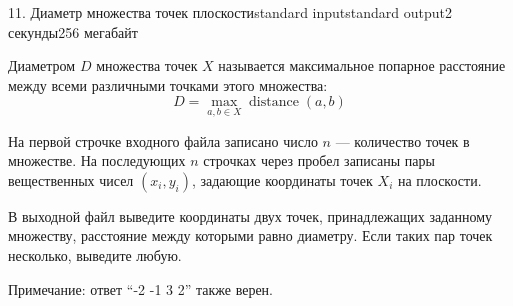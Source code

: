 \begin{problem}{11. Диаметр множества точек плоскости}{standard input}{standard output}{2 секунды}{256 мегабайт}

Диаметром $D$ множества точек $X$ называется максимальное попарное расстояние между всеми различными точками этого множества:
$$ D = \max\limits_{a, b \in X} \operatorname{distance}(a, b) $$

\InputFile

На первой строчке входного файла записано число $n$ — количество точек в множестве. На последующих $n$ строчках через пробел записаны пары вещественных чисел $(x_i, y_i)$, задающие координаты точек $X_i$ на плоскости.

\OutputFile
В выходной файл выведите координаты двух точек, принадлежащих заданному множеству, расстояние между которыми равно диаметру. Если таких пар точек несколько, выведите любую.

\Examples

\begin{example}%
%
\end{example}

\begin{example}
%
\end{example}

Примечание: ответ “-2 -1 3 2” также верен.

\end{problem}
